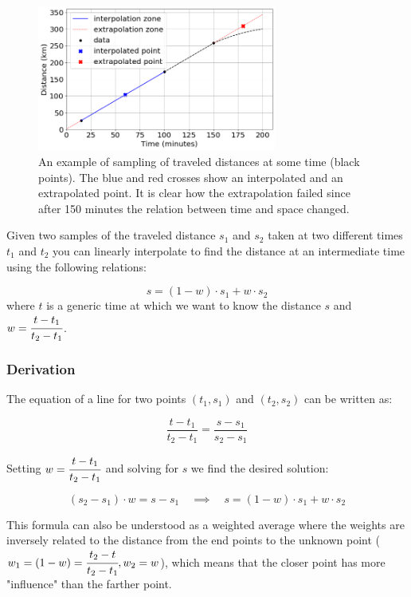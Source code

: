 \begin{figure}
  \centering
  \includegraphics[width=0.7\textwidth]{figures/interp_example1.png}
  \caption{An example of sampling of traveled distances at some time (black points). The blue and red crosses show an interpolated and an extrapolated point. It is clear how the extrapolation failed since after 150 minutes the relation between time and space changed.}
  \label{fig:samples_for_interpolation}
\end{figure}

Given two samples of the traveled distance \(s_1\) and \(s_2\) taken at two different times \(t_1\) and \(t_2\) you can linearly interpolate to find the distance at an intermediate time using the following relations:

\begin{equation}
s = (1 - w)\cdot s_1 + w \cdot s_2
\end{equation}
where $t$ is a generic time at which we want to know the distance $s$ and \(w = \cfrac{t - t_1}{t_2 - t_1}\).

\begin{attention}
\subsubsection{Derivation}
The equation of a line for two points \((t_1, s_1)\) and \((t_2, s_2)\) can be written as:

\begin{equation}
\frac{t - t_1}{t_2 - t_1} = \frac{s - s_1}{s_2 - s_1}
\end{equation}

Setting \(w = \cfrac{t - t_1}{t_2 - t_1}\) and solving for \(s\) we find the desired solution:

\begin{equation}
(s_2 - s_1)\cdot w = s - s_1\quad\implies\quad s = (1 - w)\cdot s_1 + w \cdot s_2
\end{equation}

This formula can also be understood as a weighted average where the weights are inversely related to the distance from the end points to the unknown point ($w_1 = (1 - w) = \cfrac{t_2 - t}{t_2 -t_1}, w_2 = w$), which means that the closer point has more "influence" than the farther point.
\end{attention}

